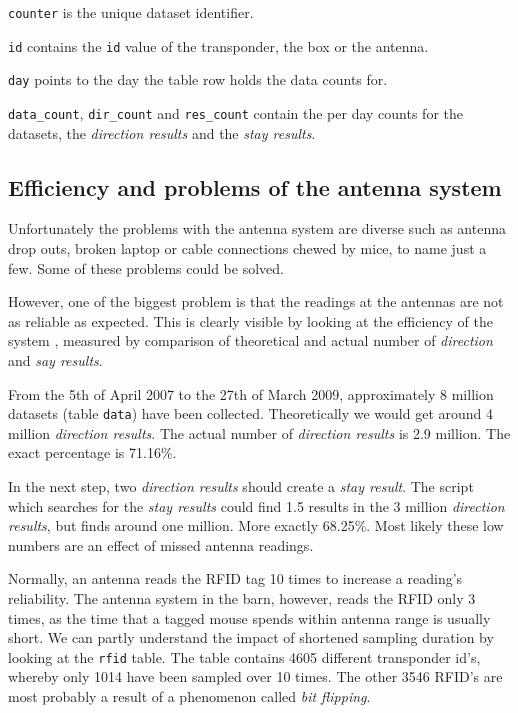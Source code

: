 \begin{mydesc}
\item \lstinline|counter| is the unique dataset identifier.
\item \lstinline|id| contains the \lstinline|id| value of the transponder, the box or the antenna.
\item \lstinline|day| points to the day the table row holds the data counts for.
\item \lstinline|data_count|, \lstinline|dir_count| and \lstinline|res_count| contain the per day counts for the datasets, the \textit{direction results} and the \textit{stay results}.
\end{mydesc}

\subsection{Efficiency and problems of the antenna system}
\label{subsec:problems}

Unfortunately the problems with the antenna system are diverse such as antenna drop outs, broken laptop or cable connections chewed by mice, to name just a few. Some of these problems could be solved.

However, one of the biggest problem is that the readings at the antennas are not as reliable as expected. This is clearly visible by looking at the efficiency of the system , measured by comparison of theoretical and actual number of \textit{direction} and \textit{say results}. 

From the 5th of April 2007 to the 27th of March 2009, approximately 8 million datasets (table \lstinline|data|)  
have been collected. Theoretically we would get around 4 million \textit{direction results}. The actual number of \textit{direction  results} is 2.9 million. The exact percentage is 71.16\%.

In the next step, two \textit{direction results} should create a \textit{stay result}. The script which searches for the \textit{stay results} could find 1.5  results in the 3 million \textit{direction results}, but finds around one million. More exactly  68.25\%. Most likely these low numbers are an effect of missed antenna readings.
 
Normally, an antenna reads the RFID tag 10 times to increase a reading's reliability. The antenna system in the barn, however, reads the RFID only 3 times, as the time that a tagged mouse spends within antenna range is usually short. We can partly understand the impact of shortened sampling duration by looking at the \lstinline|rfid| table. The table contains 4605 different transponder id's, whereby only 1014 have been sampled over 10 times. The other 3546 RFID's are most probably a result of a phenomenon called \textit{bit flipping}.

